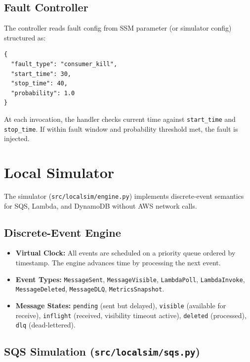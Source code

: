 \subsection{Fault Controller}

The controller reads fault config from SSM parameter (or simulator config) structured as:
\begin{verbatim}
{
  "fault_type": "consumer_kill",
  "start_time": 30,
  "stop_time": 40,
  "probability": 1.0
}
\end{verbatim}

At each invocation, the handler checks current time against \texttt{start\_time} and \texttt{stop\_time}. If within fault window and probability threshold met, the fault is injected.

\section{Local Simulator}

The simulator (\texttt{src/localsim/engine.py}) implements discrete-event semantics for SQS, Lambda, and DynamoDB without AWS network calls.

\subsection{Discrete-Event Engine}

\begin{itemize}
    \item \textbf{Virtual Clock:} All events are scheduled on a priority queue ordered by timestamp. The engine advances time by processing the next event.
    
    \item \textbf{Event Types:} \texttt{MessageSent}, \texttt{MessageVisible}, \texttt{LambdaPoll}, \texttt{LambdaInvoke}, \texttt{MessageDeleted}, \texttt{MessageDLQ}, \texttt{MetricsSnapshot}.
    
    \item \textbf{Message States:} \texttt{pending} (sent but delayed), \texttt{visible} (available for receive), \texttt{inflight} (received, visibility timeout active), \texttt{deleted} (processed), \texttt{dlq} (dead-lettered).
\end{itemize}

\subsection{SQS Simulation (\texttt{src/localsim/sqs.py})}

